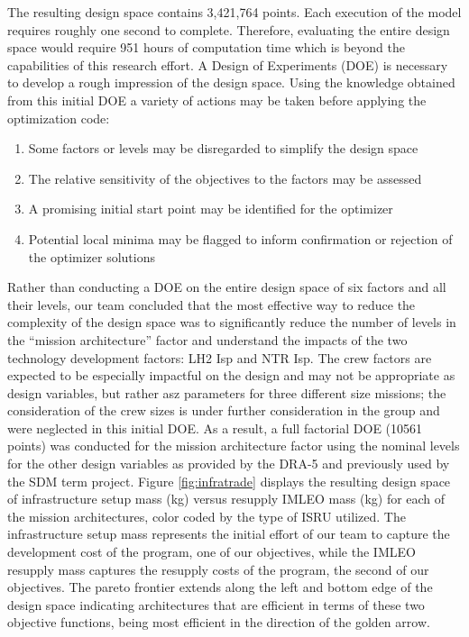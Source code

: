 \documentclass[]{aiaa-pretty}
\begin{document}
The resulting design space contains 3,421,764 points. Each execution of the model requires roughly
one second to complete. Therefore, evaluating the entire design space would require 951 hours of computation time which is beyond the capabilities of this research effort. A Design of Experiments (DOE) is necessary to develop a rough impression of the design space. Using the knowledge obtained from this initial DOE a variety of actions may be taken before applying the optimization code:

\begin{enumerate}
\item Some factors or levels may be disregarded to simplify the design space
\item The relative sensitivity of the objectives to the factors may be assessed
\item A promising initial start point may be identified for the optimizer
\item Potential local minima may be flagged to inform confirmation or rejection of the optimizer solutions
\end{enumerate}
Rather than conducting a DOE on the entire design space of six factors and all their levels, our team concluded that the most effective way to reduce the complexity of the design space was to significantly reduce the number of levels in the “mission architecture” factor and understand the impacts of the two technology development factors: LH2 Isp and NTR Isp. The crew factors are expected to be especially impactful on the design and may not be appropriate as design variables, but rather asz parameters for three different size missions; the consideration of the crew sizes is under further consideration in the group and were neglected in this initial DOE. As a result, a full factorial DOE (10561 points) was conducted for the mission architecture factor using the nominal levels for the other design variables as provided by the DRA-5 and previously used by the SDM term project. Figure \ref{fig:infratrade} displays the resulting design space of infrastructure setup mass (kg) versus resupply IMLEO mass (kg) for each of the mission architectures, color coded by the type of ISRU utilized. The infrastructure setup mass represents the initial effort of our team to capture the development cost of the program, one of our objectives, while the IMLEO resupply mass captures the resupply costs of the program, the second of our objectives. The pareto frontier extends along the left and bottom edge of the design space indicating architectures that are efficient in terms of these two objective functions, being most efficient in the direction of the golden arrow.
\end{document}

